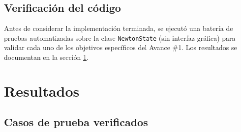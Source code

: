 \documentclass[12pt,letterpaper]{article}
\begin{document}
\subsection{Verificación del código}

Antes de considerar la implementación terminada, se ejecutó una batería de pruebas automatizadas sobre la clase \texttt{NewtonState} (sin interfaz gráfica) para validar cada uno de los objetivos específicos del Avance \#1. Los resultados se documentan en la sección \ref{sec:resultados}.

\section{Resultados}
\label{sec:resultados}

\subsection{Casos de prueba verificados}
\end{document}
